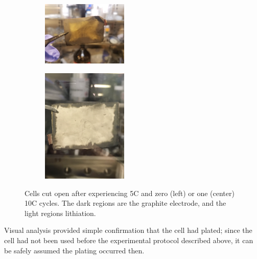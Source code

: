 \begin{figure}[t!]\label{fig:optical}
\centering
     \begin{subfigure}
         \centering
         \includegraphics[width=0.45\textwidth]{optical5c.JPG}
     \end{subfigure}
     \hfill
     \begin{subfigure}
         \centering
         \includegraphics[width=0.45\textwidth]{optical.JPG}
     \end{subfigure}
     \caption{Cells cut open after experiencing 5C and zero (left) or one (center) 10C cycles. The dark regions are the graphite electrode, and the light regions lithiation.}
\end{figure}

Visual analysis provided simple confirmation that the cell had plated; since the cell had not been used before the experimental protocol described above, it can be safely assumed the plating occurred then.

